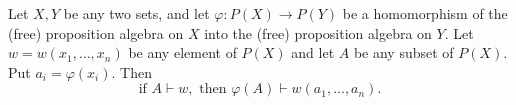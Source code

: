 Let $X, Y$ be any two sets, and let $\varphi: P(X) \to P(Y)$ be a homomorphism of the (free) proposition algebra on $X$ into the (free) proposition algebra on $Y$. Let $w = w(x_1, \ldots, x_n)$ be any element of $P(X)$ and let $A$ be any subset of $P(X)$. Put $a_i = \varphi(x_i)$. Then
$$\text{if } A \vdash w, \text{ then } \varphi(A) \vdash w(a_1, \ldots, a_n).$$
